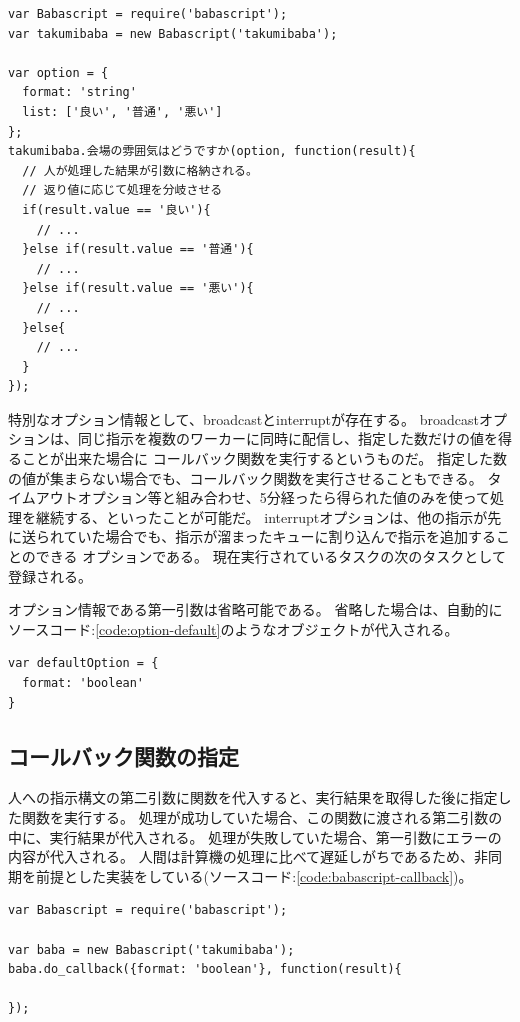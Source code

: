\begin{lstlisting}[caption=オプション情報のサンプルソースコードその2, label=code:babascript-option-list]
var Babascript = require('babascript');
var takumibaba = new Babascript('takumibaba');

var option = {
  format: 'string'
  list: ['良い', '普通', '悪い']
};
takumibaba.会場の雰囲気はどうですか(option, function(result){
  // 人が処理した結果が引数に格納される。
  // 返り値に応じて処理を分岐させる
  if(result.value == '良い'){
    // ...
  }else if(result.value == '普通'){
    // ...
  }else if(result.value == '悪い'){
    // ...
  }else{
    // ...
  }
});

\end{lstlisting}

特別なオプション情報として、broadcastとinterruptが存在する。
broadcastオプションは、同じ指示を複数のワーカーに同時に配信し、指定した数だけの値を得ることが出来た場合に
コールバック関数を実行するというものだ。
指定した数の値が集まらない場合でも、コールバック関数を実行させることもできる。
タイムアウトオプション等と組み合わせ、5分経ったら得られた値のみを使って処理を継続する、といったことが可能だ。
interruptオプションは、他の指示が先に送られていた場合でも、指示が溜まったキューに割り込んで指示を追加することのできる
オプションである。
現在実行されているタスクの次のタスクとして登録される。

オプション情報である第一引数は省略可能である。
省略した場合は、自動的にソースコード:\ref{code:option-default}のようなオブジェクトが代入される。

\begin{lstlisting}[caption=デフォルトのオプション情報, label=code:option-default]
var defaultOption = {
  format: 'boolean'
}
\end{lstlisting}

\subsection{コールバック関数の指定}\label{ux30b3ux30fcux30ebux30d0ux30c3ux30afux95a2ux6570ux306eux6307ux5b9a}

人への指示構文の第二引数に関数を代入すると、実行結果を取得した後に指定した関数を実行する。
処理が成功していた場合、この関数に渡される第二引数の中に、実行結果が代入される。
処理が失敗していた場合、第一引数にエラーの内容が代入される。
人間は計算機の処理に比べて遅延しがちであるため、非同期を前提とした実装をしている(ソースコード:\ref{code:babascript-callback})。

\begin{lstlisting}[caption=コールバック関数の指定, label=code:babascript-callback]
var Babascript = require('babascript');

var baba = new Babascript('takumibaba');
baba.do_callback({format: 'boolean'}, function(result){

});
\end{lstlisting}

